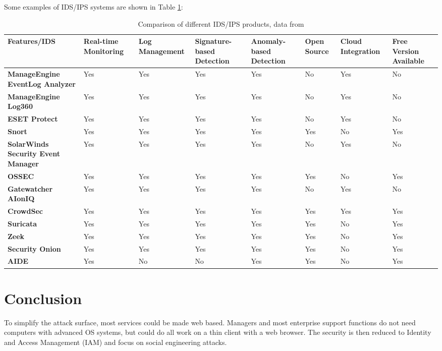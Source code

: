 \documentclass[
	letterpaper, %
	10pt, %
	unnumberedsections, %
	twoside, %
]{APAAssignment}
\begin{document}
Some examples of IDS/IPS systems are shown in Table \ref{tab:IPSProdicts}:

\begin{table}[!ht]
    \centering
    \begin{tabular}{|p{2.2cm}|p{1.5cm}|p{1.5cm}|p{1.5cm}|p{1.5cm}|p{1.5cm}|p{1.5cm}|p{1.5cm}|}
    \hline
        \textbf{Features/IDS} & \textbf{Real-time Monitoring} & \textbf{Log Management} & \textbf{Signature-based Detection} & \textbf{Anomaly-based Detection} & \textbf{Open Source} & \textbf{Cloud Integration} & \textbf{Free Version Available} \\ \hline
        \textbf{ManageEngine EventLog Analyzer} & Yes & Yes & Yes & Yes & No & Yes & No \\ \hline
        \textbf{ManageEngine Log360} & Yes & Yes & Yes & Yes & No & Yes & No \\ \hline
        \textbf{ESET Protect} & Yes & Yes & Yes & Yes & No & Yes & No \\ \hline
        \textbf{Snort} & Yes & Yes & Yes & Yes & Yes & No & Yes \\ \hline
        \textbf{SolarWinds Security Event Manager} & Yes & Yes & Yes & Yes & No & Yes & No \\ \hline
        \textbf{OSSEC} & Yes & Yes & Yes & Yes & Yes & No & Yes \\ \hline
        \textbf{Gatewatcher AIonIQ} & Yes & Yes & Yes & Yes & No & Yes & No \\ \hline
        \textbf{CrowdSec} & Yes & Yes & Yes & Yes & Yes & Yes & Yes \\ \hline
        \textbf{Suricata} & Yes & Yes & Yes & Yes & Yes & No & Yes \\ \hline
        \textbf{Zeek} & Yes & Yes & Yes & Yes & Yes & No & Yes \\ \hline
        \textbf{Security Onion} & Yes & Yes & Yes & Yes & Yes & No & Yes \\ \hline
        \textbf{AIDE} & Yes & No & No & Yes & Yes & No & Yes \\ \hline
    \end{tabular}
	\caption{Comparison of different IDS/IPS products, data from \cite{ComparitechIPSComparison}} 
	\label{tab:IPSProdicts}
\end{table}


\section{Conclusion}
To simplify the attack surface, most services could be made web based. Managers and most enterprise support functions do not need computers with advanced OS systems, but could do all work on a thin client with a web browser. The security is then reduced to Identity and Access Management (IAM) and focus on social engineering attacks.
\clearpage
\printbibliography %
\end{document}
